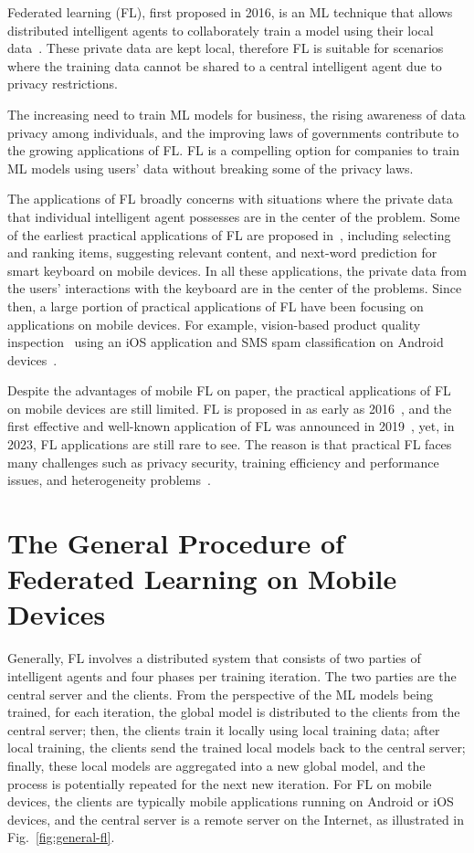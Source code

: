 \documentclass[conference]{IEEEtran}
\begin{document}
Federated learning (FL), first proposed in 2016, is an ML technique that
allows distributed intelligent agents to collaborately train a model using
their local data~\cite{mcmahan2017communication}.
These private data are kept local,
therefore FL is suitable for scenarios where
the training data cannot be shared to a central intelligent agent due to
privacy restrictions.

The increasing need to train ML models for business,
the rising awareness of data privacy among individuals,
and the improving laws of governments contribute to
the growing applications of FL.
FL is a compelling option for companies to train ML models using users' data
without breaking some of the privacy laws.

The applications of FL broadly concerns with situations where
the private data that individual intelligent agent possesses are in
the center of the problem.
Some of the earliest practical applications of FL are proposed
in~\cite{bonawitz2019towards},
including selecting and ranking items, suggesting relevant content,
and next-word prediction for smart keyboard on mobile devices.
In all these applications,
the private data from the users' interactions with
the keyboard are in the center of the problems.
Since then, a large portion of practical applications of FL have been
focusing on applications on mobile devices.
For example, vision-based product quality inspection~\cite{bharti2022edge} using
an iOS application and
SMS spam classification on Android devices~\cite{sriraman2022device}.

Despite the advantages of mobile FL on paper,
the practical applications of FL on mobile devices are still limited.
FL is proposed in as early as 2016~\cite{mcmahan2017communication},
and the first effective and well-known application of FL
was announced in 2019~\cite{bonawitz2019towards},
yet, in 2023, FL applications are still rare to see.
The reason is that practical FL faces many challenges such as
privacy security, training efficiency and performance issues,
and heterogeneity problems~\cite{wen2023survey}.

\section{The General Procedure of Federated Learning on Mobile Devices}

Generally, FL involves a distributed system that
consists of two parties of intelligent agents and
four phases per training iteration.
The two parties are the central server and the clients.
From the perspective of the ML models being trained,
for each iteration,
the global model is distributed to the clients from the central server;
then, the clients train it locally using local training data;
after local training,
the clients send the trained local models back to the central server;
finally, these local models are aggregated into a new global model,
and the process is potentially repeated for the next new iteration.
For FL on mobile devices,
the clients are typically mobile applications running on Android or iOS devices,
and the central server is a remote server on the Internet,
as illustrated in Fig.~\ref{fig:general-fl}.
\end{document}
